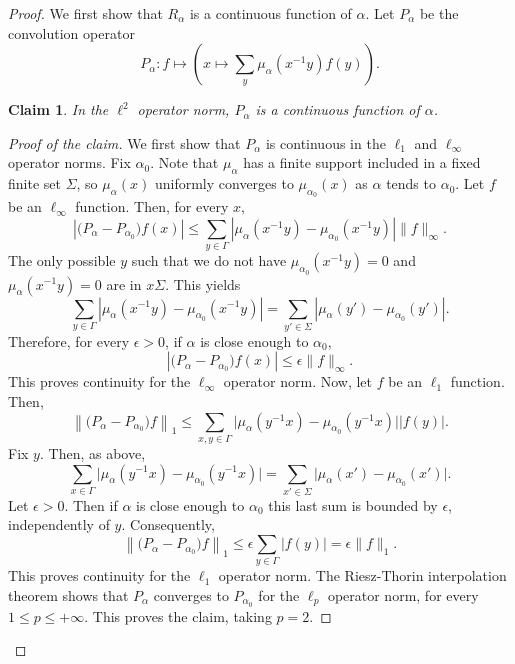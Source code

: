 \documentclass{amsart}
\newtheorem*{claim}{Claim}
\theoremstyle{definition}
\theoremstyle{remark}
\begin{document}
\begin{proof}
We first show that $R_\alpha$ is a continuous function of $\alpha$.
Let $P_\alpha$ be the convolution operator
$$P_\alpha:f\mapsto \left (x\mapsto \sum_{y}\mu_\alpha(x^{-1}y)f(y)\right).$$

\begin{claim}
In the $\ell^2$ operator norm, $P_\alpha$ is a continuous function of $\alpha$.
\end{claim}

\begin{proof}[Proof of the claim]
We first show that $P_\alpha$ is continuous in the $\ell_1$ and $\ell_{\infty}$ operator norms.
Fix $\alpha_0$.
Note that $\mu_\alpha$ has a finite support included in a fixed finite set $\Sigma$, so $\mu_\alpha(x)$ uniformly converges to $\mu_{\alpha_0}(x)$ as $\alpha$ tends to $\alpha_0$.
Let $f$ be an $\ell_\infty$ function.
Then, for every $x$,
$$\left |\bigg (P_\alpha-P_{\alpha_0}\bigg)f(x)\right |\leq \sum_{y\in \Gamma}\left |\mu_{\alpha}(x^{-1}y)-\mu_{\alpha_0}(x^{-1}y)\right|\|f\|_{\infty}.$$
The only possible $y$ such that we do not have $\mu_{\alpha_0}(x^{-1}y)=0$ and $\mu_\alpha(x^{-1}y)=0$ are in $x\Sigma$.
This yields
$$\sum_{y\in \Gamma}\left |\mu_{\alpha}(x^{-1}y)-\mu_{\alpha_0}(x^{-1}y)\right|=\sum_{y'\in \Sigma}\left |\mu_{\alpha}(y')-\mu_{\alpha_0}(y')\right |.$$
Therefore, for every $\epsilon>0$, if $\alpha$ is close enough to $\alpha_0$,
$$\left |\bigg (P_\alpha-P_{\alpha_0}\bigg)f(x)\right |\leq\epsilon \|f\|_\infty.$$
This proves continuity for the $\ell_\infty$ operator norm.
Now, let $f$ be an $\ell_1$ function. Then,
$$\left \|\bigg(P_\alpha-P_{\alpha_0}\bigg)f\right \|_1\leq \sum_{x,y\in \Gamma}\big|\mu_\alpha(y^{-1}x)-\mu_{\alpha_0}(y^{-1}x)\big||f(y)|.$$
Fix $y$.
Then, as above,
$$\sum_{x\in \Gamma}\big|\mu_\alpha(y^{-1}x)-\mu_{\alpha_0}(y^{-1}x)\big|=\sum_{x'\in \Sigma}\big|\mu_\alpha(x')-\mu_{\alpha_0}(x')\big|.$$
Let $\epsilon>0$.
Then if $\alpha$ is close enough to $\alpha_0$ this last sum is bounded by $\epsilon$, independently of $y$.
Consequently,
$$\left \|\bigg(P_\alpha-P_{\alpha_0}\bigg)f\right \|_1\leq \epsilon  \sum_{y\in \Gamma}|f(y)|=\epsilon \|f\|_1.$$
This proves continuity for the $\ell_1$ operator norm.
The Riesz-Thorin interpolation theorem \cite[Theorem~(6.27)]{Folland} shows that $P_\alpha$ converges to $P_{\alpha_0}$ for the $\ell_p$ operator norm, for every $1\leq p\leq +\infty$.
This proves the claim, taking $p=2$.
\end{proof}



\end{proof}
\end{document}
